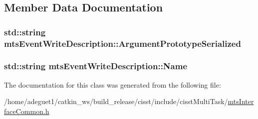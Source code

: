 \subsection{Member Data Documentation}
\hypertarget{classmts_event_write_description_aa94962132b61730529206de2a8091eea}{
\subsubsection[{Argument\-Prototype\-Serialized}]{\setlength{\rightskip}{0pt plus 5cm}std\-::string mts\-Event\-Write\-Description\-::\-Argument\-Prototype\-Serialized}}\label{classmts_event_write_description_aa94962132b61730529206de2a8091eea}
\hypertarget{classmts_event_write_description_a1e1e1cffe816c08df79930d093fc15c2}{
\subsubsection[{Name}]{\setlength{\rightskip}{0pt plus 5cm}std\-::string mts\-Event\-Write\-Description\-::\-Name}}\label{classmts_event_write_description_a1e1e1cffe816c08df79930d093fc15c2}


The documentation for this class was generated from the following file\-:\begin{DoxyCompactItemize}
\item 
/home/adeguet1/catkin\-\_\-ws/build\-\_\-release/cisst/include/cisst\-Multi\-Task/\hyperlink{mts_interface_common_8h}{mts\-Interface\-Common.\-h}\end{DoxyCompactItemize}
